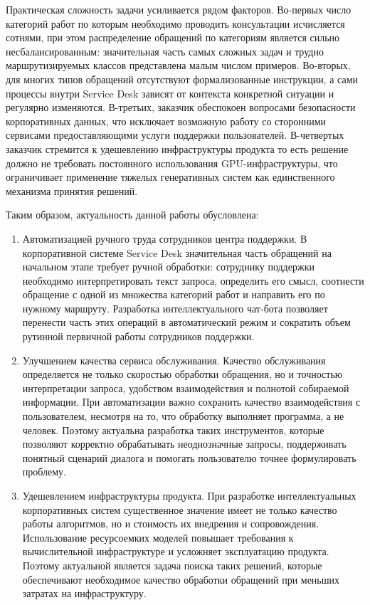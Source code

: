 \documentclass[14pt,a4paper]{extarticle}
\renewcommand{\textbf}[1]{#1}
\numberwithin{figure}{section}
\numberwithin{table}{section}
\begin{document}
Практическая сложность задачи усиливается рядом факторов. Во-первых
число \textbf{категорий работ} по которым необходимо проводить
консультации исчисляется сотнями, при этом распределение обращений по
категориям является сильно несбалансированным: значительная часть самых
сложных задач и трудно маршрутизируемых классов представлена малым
числом примеров. Во-вторых, для многих типов обращений отсутствуют
формализованные инструкции, а сами процессы внутри Service Desk зависят
от контекста конкретной ситуации и регулярно изменяются. В-третьих,
заказчик обеспокоен вопросами безопасности корпоративных данных, что
исключает возможную работу со сторонними сервисами предоставляющими
услуги поддержки пользователей. В-четвертых заказчик стремится к
удешевлению инфраструктуры продукта то есть решение должно не требовать
постоянного использования GPU-инфраструктуры, что ограничивает
применение тяжелых генеративных систем как единственного механизма
принятия решений.

Таким образом, актуальность данной работы обусловлена:

\begin{enumerate}
\def\labelenumi{\arabic{enumi}.}
\item Автоматизацией ручного труда сотрудников центра поддержки. В
корпоративной системе Service Desk значительная часть обращений на
начальном этапе требует ручной обработки: сотруднику поддержки
необходимо интерпретировать текст запроса, определить его смысл,
соотнести обращение с одной из множества категорий работ и направить его
по нужному маршруту. Разработка интеллектуального чат-бота позволяет
перенести часть этих операций в автоматический режим и сократить объем
рутинной первичной работы сотрудников поддержки.
\item Улучшением качества сервиса обслуживания. Качество обслуживания
определяется не только скоростью обработки обращения, но и точностью
интерпретации запроса, удобством взаимодействия и полнотой собираемой
информации. При автоматизации важно сохранить качество взаимодействия с
пользователем, несмотря на то, что обработку выполняет программа, а не
человек. Поэтому актуальна разработка таких инструментов, которые
позволяют корректно обрабатывать неоднозначные запросы, поддерживать
понятный сценарий диалога и помогать пользователю точнее формулировать
проблему.
\item Удешевлением инфраструктуры продукта. При разработке
интеллектуальных корпоративных систем существенное значение имеет не
только качество работы алгоритмов, но и стоимость их внедрения и
сопровождения. Использование ресурсоемких моделей повышает требования к
вычислительной инфраструктуре и усложняет эксплуатацию продукта.
Поэтому актуальной является задача поиска таких решений, которые
обеспечивают необходимое качество обработки обращений при меньших
затратах на инфраструктуру.
\end{enumerate}
\end{document}
